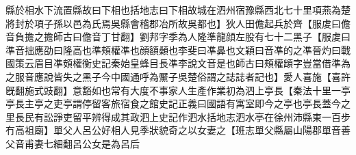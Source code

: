 縣於相水下流置縣故曰下相也括地志曰下相故城在泗州宿豫縣西北七十里項燕為楚將封於項子孫以邑為氏焉吳縣會稽郡冶所故吳都也】狄人田儋起兵於齊【服䖍曰儋音負擔之擔師古曰儋音丁甘翻】劉邦字季為人隆準龍顔左股有七十二黑子【服䖍曰準音拙應劭曰隆高也準頰權凖也顔額顙也李斐曰凖鼻也文穎曰音凖的之凖晉灼曰戰國策云眉目凖頞權衡史記秦始皇蜂目長凖李說文音是也師古曰頰權䪼字豈當借準為之服音應說皆失之黑子今中國通呼為黶子吳楚俗謂之誌誌者記也】愛人喜施【喜許旣翻施式豉翻】意豁如也常有大度不事家人生產作業初為泗上亭長【秦法十里一亭亭長主亭之吏亭謂停留客旅宿食之館史記正義曰國語有寓室即今之亭也亭長蓋今之里長民有訟諍吏留平辨得成其政泗上史記作泗水括地志泗水亭在徐州沛縣東一百步冇高祖廟】單父人呂公好相人見季狀貌奇之以女妻之【班志單父縣屬山陽郡單音善父音甫妻七細翻呂公女是為呂后